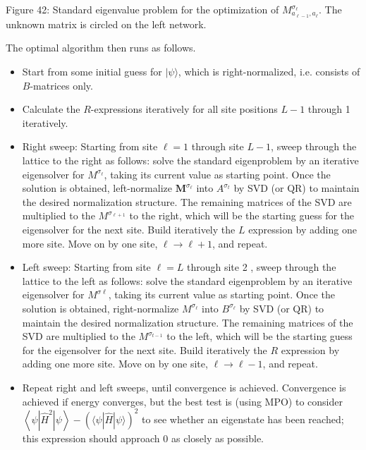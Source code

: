 \documentclass[12pt]{article}
\begin{document}
Figure 42: Standard eigenvalue problem for the optimization of $M_{a_{\ell-1}, a_{\ell}}^{\sigma_{\ell}}$. The unknown matrix is circled on the left network.

The optimal algorithm then runs as follows.

\begin{itemize}
  \item Start from some initial guess for $|\psi\rangle$, which is right-normalized, i.e. consists of $B$-matrices only.
  \item Calculate the $R$-expressions iteratively for all site positions $L-1$ through 1 iteratively.
  \item Right sweep: Starting from site $\ell=1$ through site $L-1$, sweep through the lattice to the right as follows: solve the standard eigenproblem by an iterative eigensolver for $M^{\sigma_{\ell}}$, taking its current value as starting point. Once the solution is obtained, left-normalize $\boldsymbol{M}^{\sigma_{\ell}}$ into $A^{\sigma_{t}}$ by SVD (or QR) to maintain the desired normalization structure. The remaining matrices of the SVD are multiplied to the $M^{\sigma_{\ell+1}}$ to the right, which will be the starting guess for the eigensolver for the next site. Build iteratively the $L$ expression by adding one more site. Move on by one site, $\ell \rightarrow \ell+1$, and repeat.
  \item Left sweep: Starting from site $\ell=L$ through site 2 , sweep through the lattice to the left as follows: solve the standard eigenproblem by an iterative eigensolver for $M^{\sigma \ell}$, taking its current value as starting point. Once the solution is obtained, right-normalize $M^{\sigma_{\ell}}$ into $B^{\sigma_{\ell}}$ by SVD (or QR) to maintain the desired normalization structure. The remaining matrices of the SVD are multiplied to the $M^{\sigma_{t-1}}$ to the left, which will be the starting guess for the eigensolver for the next site. Build iteratively the $R$ expression by adding one more site. Move on by one site, $\ell \rightarrow \ell-1$, and repeat.
  \item Repeat right and left sweeps, until convergence is achieved. Convergence is achieved if energy converges, but the best test is (using MPO) to consider $\left\langle\psi\left|\hat{H}^{2}\right| \psi\right\rangle-(\langle\psi|\hat{H}| \psi\rangle)^{2}$ to see whether an eigenstate has been reached; this expression should approach 0 as closely as possible.
\end{itemize}
\end{document}
